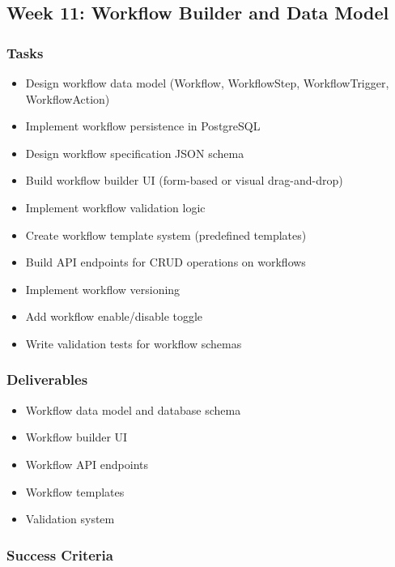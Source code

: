 \documentclass[12pt,oneside]{report}
\begin{document}
\subsection{Week 11: Workflow Builder and Data Model}

\subsubsection{Tasks}

\begin{itemize}
    \item Design workflow data model (Workflow, WorkflowStep, WorkflowTrigger, WorkflowAction)
    \item Implement workflow persistence in PostgreSQL
    \item Design workflow specification JSON schema
    \item Build workflow builder UI (form-based or visual drag-and-drop)
    \item Implement workflow validation logic
    \item Create workflow template system (predefined templates)
    \item Build API endpoints for CRUD operations on workflows
    \item Implement workflow versioning
    \item Add workflow enable/disable toggle
    \item Write validation tests for workflow schemas
\end{itemize}

\subsubsection{Deliverables}

\begin{itemize}
    \item Workflow data model and database schema
    \item Workflow builder UI
    \item Workflow API endpoints
    \item Workflow templates
    \item Validation system
\end{itemize}

\subsubsection{Success Criteria}
\end{document}
